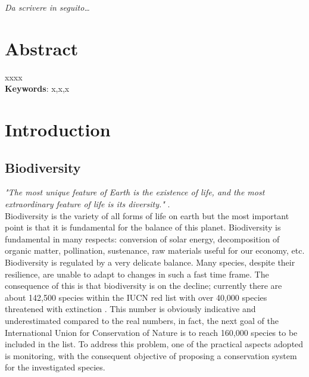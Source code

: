 \documentclass[12pt,a4paper]{article}
\begin{document}
\begin{titlepage}                      
%
\thispagestyle{empty}                   %
\topmargin=6.5cm                        %
\raggedleft                             %
\large                                  %
                                       
\em                                     %
Da scrivere in seguito\ldots                      %
\newpage                                
\clearpage{\pagestyle{empty}\cleardoublepage}%
\end{titlepage}
\linespread{1.2} 
\newpage
\tableofcontents
\linespread{1.5} 
\newpage
\section{Abstract}
 xxxx\\
 
 
\vspace{1cm}
\textbf{Keywords}: x,x,x

\newpage
\section{Introduction}
\subsection{Biodiversity}
\textit{"The most unique feature of Earth is the existence of life, and the most extraordinary feature of life is its diversity."} \citep{cardinale}.\\
Biodiversity is the variety of all forms of life on earth but the most important point is that it is fundamental for the balance of this planet.
Biodiversity is fundamental in many respects: conversion of solar energy, decomposition of organic matter, pollination, sustenance, raw materials useful for our economy, etc.
Biodiversity is regulated by a very delicate balance.
Many species, despite their resilience, are unable to adapt to changes in such a fast time frame.
The consequence of this is that biodiversity is on the decline; currently there are about 142,500 species within the IUCN red list with over 40,000 species threatened with extinction \citep{IUCN}. This number is obviously indicative and underestimated compared to the real numbers, in fact, the next goal of the International Union for Conservation of Nature is to reach 160,000 species to be included in the list.
To address this problem, one of the practical aspects adopted is monitoring, with the consequent objective of proposing a conservation system for the investigated species.
\end{document}
